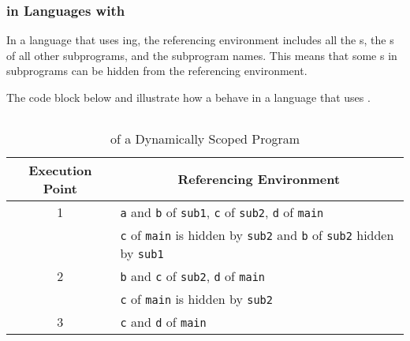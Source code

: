 \subsubsection{ in Languages with }\label{subsubsec:Dynamic_Scope_Referencing_Environment}
In a language that uses ing, the referencing environment includes all the s, the s of all other  subprograms, and the subprogram names.
This means that some s in  subprograms can be hidden from the referencing environment.

The code block below and  illustrate how a  behave in a language that uses .

\inputminted[frame=lines,linenos]{c++}{./EDAP05-Concepts_Programming_Languages-Sections/Names_Identifiers/Code/Dynamic_Scope_Referencing_Environment.cpp}

\begin{table}[h!]
  \centering
  \begin{tabular}{cl}
    \toprule
    Execution Point & \multicolumn{1}{c}{Referencing Environment} \\
    \midrule
    1 & \texttt{a} and \texttt{b} of \texttt{sub1}, \texttt{c} of \texttt{sub2}, \texttt{d} of \texttt{main} \\
                    & \texttt{c} of \texttt{main} is hidden by \texttt{sub2} and \texttt{b} of \texttt{sub2} hidden by \texttt{sub1} \\
    2 & \texttt{b} and \texttt{c} of \texttt{sub2}, \texttt{d} of \texttt{main} \\
                    & \texttt{c} of \texttt{main} is hidden by \texttt{sub2} \\
    3 & \texttt{c} and \texttt{d} of \texttt{main} \\
    \bottomrule
  \end{tabular}
  \caption{ of a Dynamically Scoped Program}
  \label{tab:Dynamic_Scope_Referencing_Environment-Execution}
\end{table}

